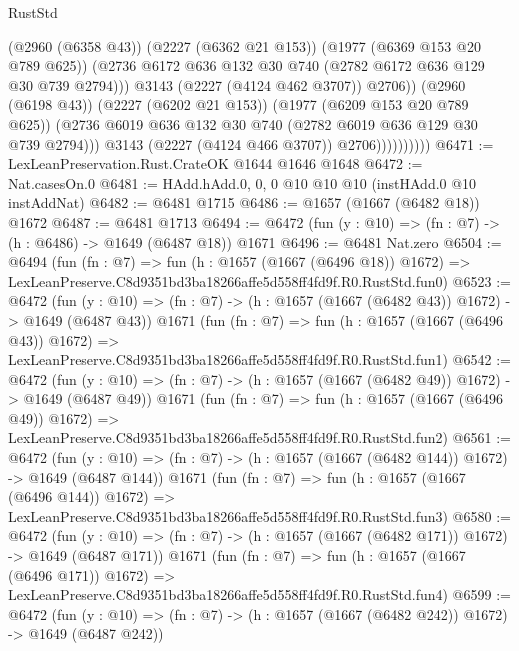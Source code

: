 \begin{lexlean}{RustStd}
\begin{coremodule}
                                (@2960 (@6358 @43))
                                (@2227 (@6362 @21 @153))
                                (@1977 (@6369 @153 @20 @789 @625))
                                (@2736
                                  @6172
                                  @636
                                  @132
                                  @30
                                  @740
                                  (@2782 @6172 @636 @129 @30 @739 @2794)))
                              @3143
                              (@2227 (@4124 @462 @3707))
                              @2706))
                          (@2960 (@6198 @43))
                          (@2227 (@6202 @21 @153))
                          (@1977 (@6209 @153 @20 @789 @625))
                          (@2736 @6019 @636 @132 @30 @740 (@2782 @6019 @636 @129 @30 @739 @2794)))
                        @3143
                        (@2227 (@4124 @466 @3707))
                        @2706))))))))))
@6471 := LexLeanPreservation.Rust.CrateOK @1644 @1646 @1648
@6472 := Nat.casesOn.{0}
@6481 := HAdd.hAdd.{0, 0, 0} @10 @10 @10 (instHAdd.{0} @10 instAddNat)
@6482 := @6481 @1715
@6486 := @1657 (@1667 (@6482 @18)) @1672
@6487 := @6481 @1713
@6494 := @6472 (fun (y : @10) => (fn : @7) -> (h : @6486) -> @1649 (@6487 @18)) @1671
@6496 := @6481 Nat.zero
@6504 := @6494
    (fun (fn : @7) =>
    fun (h : @1657 (@1667 (@6496 @18)) @1672) =>
    LexLeanPreserve.C8d9351bd3ba18266affe5d558ff4fd9f.R0.RustStd.fun0)
@6523 := @6472
    (fun (y : @10) => (fn : @7) -> (h : @1657 (@1667 (@6482 @43)) @1672) -> @1649 (@6487 @43))
    @1671
    (fun (fn : @7) =>
    fun (h : @1657 (@1667 (@6496 @43)) @1672) =>
    LexLeanPreserve.C8d9351bd3ba18266affe5d558ff4fd9f.R0.RustStd.fun1)
@6542 := @6472
    (fun (y : @10) => (fn : @7) -> (h : @1657 (@1667 (@6482 @49)) @1672) -> @1649 (@6487 @49))
    @1671
    (fun (fn : @7) =>
    fun (h : @1657 (@1667 (@6496 @49)) @1672) =>
    LexLeanPreserve.C8d9351bd3ba18266affe5d558ff4fd9f.R0.RustStd.fun2)
@6561 := @6472
    (fun (y : @10) => (fn : @7) -> (h : @1657 (@1667 (@6482 @144)) @1672) -> @1649 (@6487 @144))
    @1671
    (fun (fn : @7) =>
    fun (h : @1657 (@1667 (@6496 @144)) @1672) =>
    LexLeanPreserve.C8d9351bd3ba18266affe5d558ff4fd9f.R0.RustStd.fun3)
@6580 := @6472
    (fun (y : @10) => (fn : @7) -> (h : @1657 (@1667 (@6482 @171)) @1672) -> @1649 (@6487 @171))
    @1671
    (fun (fn : @7) =>
    fun (h : @1657 (@1667 (@6496 @171)) @1672) =>
    LexLeanPreserve.C8d9351bd3ba18266affe5d558ff4fd9f.R0.RustStd.fun4)
@6599 := @6472
    (fun (y : @10) => (fn : @7) -> (h : @1657 (@1667 (@6482 @242)) @1672) -> @1649 (@6487 @242))

\end{coremodule}
\end{lexlean}
